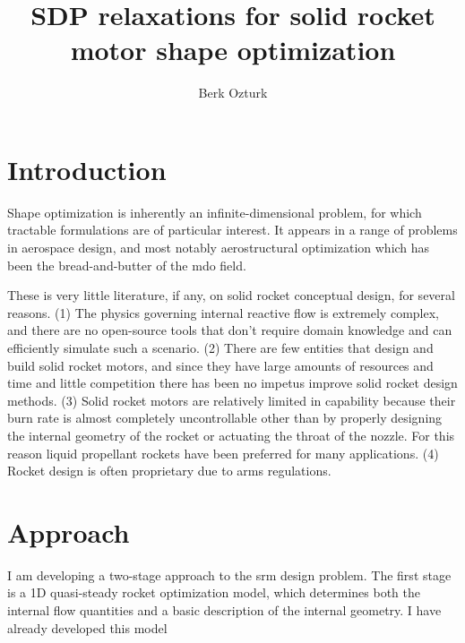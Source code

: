 \documentclass[11pt]{article}
\begin{document}
    \title{SDP relaxations for solid rocket motor shape optimization}
    \author{Berk Ozturk}
    \maketitle

    \section{Introduction}
    
    Shape optimization is inherently an infinite-dimensional problem,
for which tractable formulations are of particular interest.
    It appears in a range of problems in aerospace design, and most notably
    aerostructural optimization which has been the bread-and-butter of the \gls{mdo} field.

	These is very little literature, if any, on solid rocket conceptual design,
for several reasons. (1) The physics governing internal reactive flow is extremely complex,
and there are no open-source tools that don't require domain knowledge and
can efficiently simulate such a scenario.
(2) There are few entities that design and build solid rocket motors, and since they have
large amounts of resources and time and little competition there has been no impetus
improve solid rocket design methods. (3) Solid rocket motors are relatively limited
in capability because their burn rate is almost completely uncontrollable other
than by properly designing the internal geometry of the rocket or actuating the
throat of the nozzle. For this reason liquid propellant rockets have been preferred for
many applications. (4) Rocket design is often proprietary due to arms regulations.

    \section{Approach}
    
    I am developing a two-stage approach to the \gls{srm} design problem. The first stage is a 1D quasi-steady rocket optimization model, which determines both the internal flow quantities and a basic description of the internal geometry. I have already developed this model 
    
\end{document}

